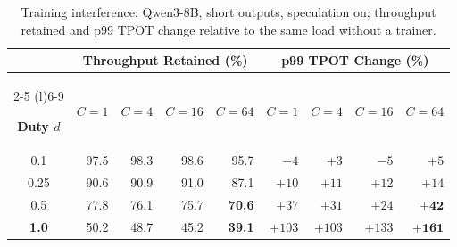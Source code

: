 \documentclass{article}
\begin{document}
\begin{table}[!htbp]
\caption{Training interference: Qwen3-8B, short outputs, speculation on; throughput retained and p99 TPOT change relative to the same load without a trainer.}
\label{tab:duty}
\centering\small

\begingroup
\renewcommand{\arraystretch}{1.20}
\setlength{\tabcolsep}{3.5pt}

\begin{tabular}{@{}crrrrrrrr@{}}
\toprule

&
\multicolumn{4}{c}{
  \textbf{Throughput Retained (\%)}
}
&
\multicolumn{4}{c}{
  \textbf{p99 TPOT Change (\%)}
} \\

\cmidrule(lr){2-5}
\cmidrule(l){6-9}

\textbf{Duty $d$}
& \textbf{$C{=}1$}
& \textbf{$C{=}4$}
& \textbf{$C{=}16$}
& \textbf{$C{=}64$}
& \textbf{$C{=}1$}
& \textbf{$C{=}4$}
& \textbf{$C{=}16$}
& \textbf{$C{=}64$} \\

\midrule

0.1
& 97.5 & 98.3 & 98.6 & 95.7
& $+4$ & $+3$ & $-5$ & $+5$ \\

0.25
& 90.6 & 90.9 & 91.0 & 87.1
& $+10$ & $+11$ & $+12$ & $+14$ \\

\addlinespace[3pt]

0.5
& 77.8
& 76.1
& 75.7
& \cellcolor{tabHighlight}\textbf{70.6}
& $+37$
& $+31$
& $+24$
& \cellcolor{tabHighlight}$\boldsymbol{+42}$ \\

\rowcolor{tabGroup}
\textbf{1.0}
& 50.2
& 48.7
& 45.2
& \cellcolor{tabDrop}\textbf{39.1}
& $+103$
& $+103$
& $+133$
& \cellcolor{tabDrop}$\boldsymbol{+161}$ \\

\bottomrule
\end{tabular}
\endgroup

\end{table}
\end{document}
